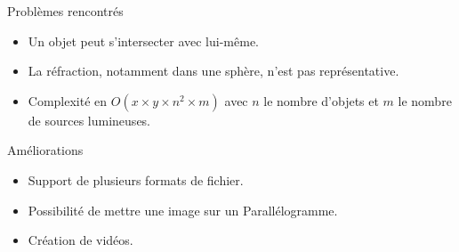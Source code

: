 \documentclass{beamer}
\begin{document}
  \begin{frame}{Problèmes rencontrés}
    \begin{itemize}
      \item Un objet peut s'intersecter avec lui-même.
      \item La réfraction, notamment dans une sphère, n'est pas représentative.
      \item Complexité en $O(x\times y\times n^2 \times m)$ avec $n$ le nombre
        d'objets et $m$ le nombre de sources lumineuses.
    \end{itemize}
  \end{frame}

  \begin{frame}{Améliorations}
    \begin{itemize}
      \item Support de plusieurs formats de fichier.
      \item Possibilité de mettre une image sur un Parallélogramme.
      \item Création de vidéos.
    \end{itemize}
  \end{frame}
\end{document}
